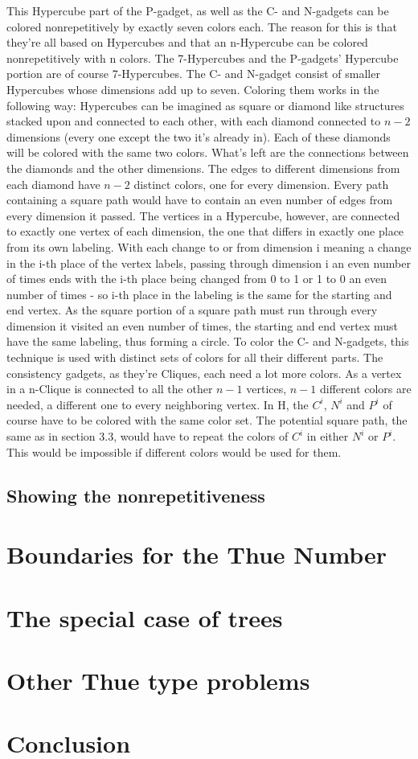 \documentclass[12pt,a4paper]{article}
\begin{document}
This Hypercube part of the P-gadget, as well as the C- and N-gadgets can be colored nonrepetitively by exactly seven colors each. The reason for this is that they're all based on Hypercubes and that an n-Hypercube can be colored nonrepetitively with n colors. The 7-Hypercubes and the P-gadgets' Hypercube portion are of course 7-Hypercubes. The C- and N-gadget consist of smaller Hypercubes whose dimensions add up to seven. Coloring them works in the following way: Hypercubes can be imagined as square or diamond like structures stacked upon and connected to each other, with each diamond connected to $n-2$ dimensions (every one except the two it's already in). Each of these diamonds will be colored with the same two colors. What's left are the connections between the diamonds and the other dimensions. The edges to different dimensions from each diamond have $n-2$ distinct colors, one for every dimension. Every path containing a square path would have to contain an even number of edges from every dimension it passed. The vertices in a Hypercube, however, are connected to exactly one vertex of each dimension, the one that differs in exactly one place from its own labeling. With each change to or from dimension i meaning a change in the i-th place of the vertex labels, passing through dimension i an even number of times ends with the i-th place being changed from 0 to 1 or 1 to 0 an even number of times - so i-th place in the labeling is the same for the starting and end vertex. As the square portion of a square path must run through every dimension it visited an even number of times, the starting and end vertex must have the same labeling, thus forming a circle. 
\newline
To color the C- and N-gadgets, this technique is used with distinct sets of colors for all their different parts. The consistency gadgets, as they're Cliques, each need a lot more colors. As a vertex in a n-Clique is connected to all the other $n-1$ vertices, $n-1$ different colors are needed, a different one to every neighboring vertex. 
\newline
In H, the $C^i$, $N^i$ and $P^i$ of course have to be colored with the same color set. The potential square path, the same as in section 3.3, would have to repeat the colors of $C^i$ in either $N^i$ or $P^i$. This would be impossible if different colors would be used for them. 

\subsection{Showing the nonrepetitiveness}
\section{Boundaries for the Thue Number}
\section{The special case of trees}
\section{Other Thue type problems}

\section{Conclusion}

\newpage
\printbibliography
\end{document}
